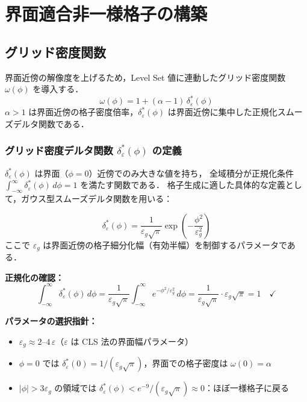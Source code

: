 \section{界面適合非一様格子の構築}
\label{sec:grid}

\subsection{グリッド密度関数}

界面近傍の解像度を上げるため，Level Set 値に連動したグリッド密度関数 $\omega(\phi)$ を導入する．
\begin{equation}
  \omega(\phi) = 1 + (\alpha - 1)\,\delta_\varepsilon^*(\phi)
\end{equation}
$\alpha > 1$ は界面近傍の格子密度倍率，$\delta_\varepsilon^*(\phi)$ は界面近傍に集中した正規化スムーズデルタ関数である．

\subsubsection{グリッド密度デルタ関数 $\delta_\varepsilon^*(\phi)$ の定義}

$\delta_\varepsilon^*(\phi)$ は界面（$\phi=0$）近傍でのみ大きな値を持ち，
全域積分が正規化条件 $\int_{-\infty}^{\infty}\delta_\varepsilon^*(\phi)\,d\phi = 1$ を満たす関数である．
格子生成に適した具体的な定義として，ガウス型スムーズデルタ関数を用いる：

\begin{tcolorbox}[mybox, title={グリッド密度デルタ関数の定義（ガウス型）}]
\begin{equation}
  \delta_\varepsilon^*(\phi) =
  \frac{1}{\varepsilon_g\sqrt{\pi}}\exp\!\left(-\frac{\phi^2}{\varepsilon_g^2}\right)
  \label{eq:grid_delta}
\end{equation}
ここで $\varepsilon_g$ は界面近傍の格子細分化幅（有効半幅）を制御するパラメータである．

\textbf{正規化の確認：}
\[
  \int_{-\infty}^{\infty} \delta_\varepsilon^*(\phi)\,d\phi
  = \frac{1}{\varepsilon_g\sqrt{\pi}}\int_{-\infty}^{\infty}e^{-\phi^2/\varepsilon_g^2}\,d\phi
  = \frac{1}{\varepsilon_g\sqrt{\pi}} \cdot \varepsilon_g\sqrt{\pi} = 1 \quad \checkmark
\]

\textbf{パラメータの選択指針：}
\begin{itemize}
  \item $\varepsilon_g \approx 2\text{--}4 \, \varepsilon$（$\varepsilon$ は CLS 法の界面幅パラメータ）
  \item $\phi = 0$ では $\delta_\varepsilon^*(0) = 1/(\varepsilon_g\sqrt{\pi})$，界面での格子密度は $\omega(0) = \alpha$
  \item $|\phi| > 3\varepsilon_g$ の領域では $\delta_\varepsilon^*(\phi) < e^{-9}/(\varepsilon_g\sqrt{\pi}) \approx 0$：ほぼ一様格子に戻る
\end{itemize}
\end{tcolorbox}

